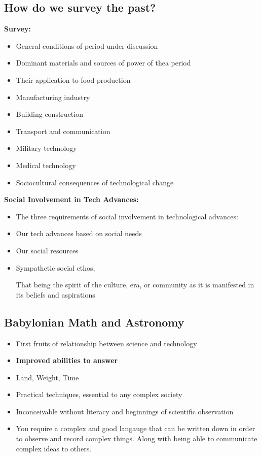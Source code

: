 \documentclass{article}
\begin{document}
\subsection{How do we survey the past?}
\textbf{Survey:}
\begin{itemize}
  \item General conditions of period under discussion
  \item Dominant materials and sources of power of thea period
  \item Their application to food production
  \item Manufacturing industry
  \item Building construction
  \item Transport and communication
  \item Military technology
  \item Medical technology
  \item Sociocultural consequences of technological change
\end{itemize}

\textbf{Social Involvement in Tech Advances:}
\begin{itemize}
  \item The three requirements of social involvement in technological advances:
  \item Our tech advances based on social needs
  \item Our social resources
  \item Sympathetic social ethos,

    That being the spirit of the culture, era, or community
    as it is manifested in its beliefs and aspirations
\end{itemize}

\subsection{Babylonian Math and Astronomy}
\begin{itemize}
  \item First fruits of relationship between science and technology
\item \textbf{Improved abilities to answer}
\item Land, Weight, Time
\item Practical techniques, essential to any complex society
\item Inconceivable without literacy and beginnings of scientific observation
\item You require a complex and good langauge that can be written down
  in order to observe and record complex things.
  Along with being able to communicate complex ideas to others.
\end{itemize}
\end{document}
